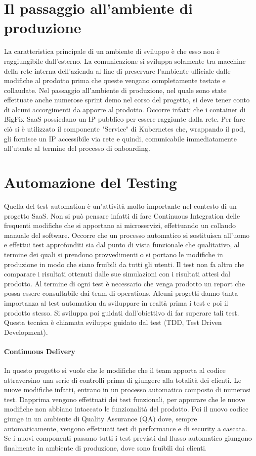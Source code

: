 \section{Il passaggio all'ambiente di produzione}
La caratteristica principale di un ambiente di sviluppo è che esso non è raggiungibile dall'esterno. La comunicazione si sviluppa solamente tra macchine della rete interna dell'azienda al fine di preservare l'ambiente ufficiale dalle modifiche al prodotto prima che queste vengano completamente testate e collaudate. Nel passaggio all'ambiente di produzione, nel quale sono state effettuate anche numerose sprint demo nel corso del progetto, si deve tener conto di alcuni accorgimenti da apporre al prodotto. Occorre infatti che i container di BigFix SaaS possiedano un IP pubblico per essere raggiunte dalla rete. Per fare ciò si è utilizzato il componente "Service" di Kubernetes che, wrappando il pod, gli fornisce un IP accessibile via rete e quindi, comunicabile immediatamente all'utente al termine del processo di onboarding.

\section{Automazione del Testing}
Quella del test automation è un'attività molto importante nel contesto di un progetto SaaS. Non si può pensare infatti di fare Continuous Integration delle frequenti modifiche che si apportano ai microservizi, effettuando un collaudo manuale del software. Occorre che un processo automatico si sostituisca all'uomo e effettui test approfonditi sia dal punto di vista funzionale che qualitativo, al termine dei quali si prendono provvedimenti o si portano le modifiche in produzione in modo che siano fruibili da tutti gli utenti. Il test non fa altro che comparare i risultati ottenuti dalle sue simulazioni con i risultati attesi dal prodotto. Al termine di ogni test è necessario che venga prodotto un report che possa essere consultabile dai team di operations. Alcuni progetti danno tanta importanza al test automation da sviluppare in realtà prima i test e poi il prodotto stesso. Si sviluppa poi guidati dall'obiettivo di far superare tali test. Questa tecnica è chiamata sviluppo guidato dal test (TDD, Test Driven Development).
\paragraph{Continuous Delivery}
In questo progetto si vuole che le modifiche che il team apporta al codice attraversino una serie di controlli prima di giungere alla totalità dei clienti. Le nuove modifiche infatti, entrano in un processo automatico composto di numerosi test. Dapprima vengono effettuati dei test funzionali, per appurare che le nuove modifiche non abbiano intaccato le funzionalità del prodotto. Poi il nuovo codice giunge in un ambiente di Quality Assurance (QA) dove, sempre automaticamente, vengono effettuati test di performance e di security a cascata. Se i nuovi componenti passano tutti i test previsti dal flusso automatico giungono finalmente in ambiente di produzione, dove sono fruibili dai clienti. 
